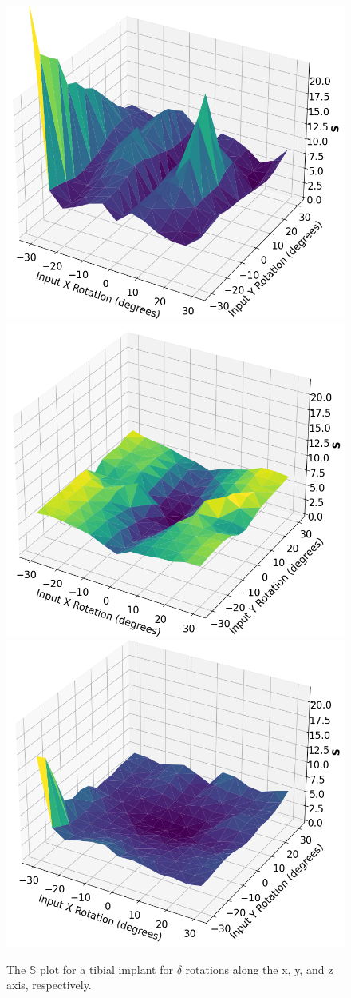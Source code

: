 \begin{figure}[h!]
	\centering
	\includegraphics[width=0.3\linewidth]{Tibial_dx_sensitivity.png}
	\includegraphics[width=0.3\linewidth]{Tibial_dy_sensitivity.png}
	\includegraphics[width=0.3\linewidth]{Tibial_dz_sensitivity.png}
	\caption{The $\mathbb{S}$ plot for a tibial implant for $\delta$ rotations along the x, y, and z axis, respectively.}
	\label{fig:tib_sensitivity_plot}
\end{figure}



